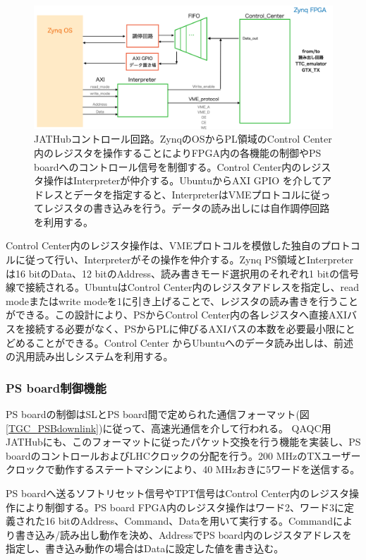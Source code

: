 \begin{figure} 
\centering
\includegraphics[width=16cm]{fig/QAQC/JATHubccenter.png}
\caption[JATHubコントロール回路]{JATHubコントロール回路。ZynqのOSからPL領域のControl Center内のレジスタを操作することによりFPGA内の各機能の制御やPS boardへのコントロール信号を制御する。Control Center内のレジスタ操作はInterpreterが仲介する。UbuntuからAXI GPIO を介してアドレスとデータを指定すると、InterpreterはVMEプロトコルに従ってレジスタの書き込みを行う。データの読み出しには自作調停回路を利用する。}
\label{JATHubccenter}
\end{figure}

Control Center内のレジスタ操作は、VMEプロトコルを模倣した独自のプロトコルに従って行い、Interpreterがその操作を仲介する。Zynq PS領域とInterpreterは16 bitのData、12 bitのAddress、読み書きモード選択用のそれぞれ1 bitの信号線で接続される。UbuntuはControl Center内のレジスタアドレスを指定し、read modeまたはwrite modeを1に引き上げることで、レジスタの読み書きを行うことができる。この設計により、PSからControl Center内の各レジスタへ直接AXIバスを接続する必要がなく、PSからPLに伸びるAXIバスの本数を必要最小限にとどめることができる。Control Center からUbuntuへのデータ読み出しは、前述の汎用読み出しシステムを利用する。

\subsubsection{PS board制御機能}
PS boardの制御はSLとPS board間で定められた通信フォーマット(図\ref{TGC_PSBdownlink})に従って、高速光通信を介して行われる。
QAQC用JATHubにも、このフォーマットに従ったパケット交換を行う機能を実装し、PS boardのコントロールおよびLHCクロックの分配を行う。200 MHzのTXユーザークロックで動作するステートマシンにより、40 MHzおきに5ワードを送信する。

PS boardへ送るソフトリセット信号やTPT信号はControl Center内のレジスタ操作により制御する。PS board FPGA内のレジスタ操作はワード2、ワード3に定義された16 bitのAddress、Command、Dataを用いて実行する。Commandにより書き込み/読み出し動作を決め、AddressでPS board内のレジスタアドレスを指定し、書き込み動作の場合はDataに設定した値を書き込む。


